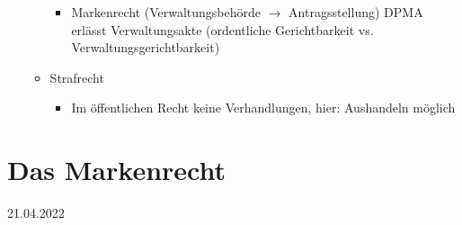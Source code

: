 \documentclass{report}
\begin{document}
\begin{itemize}
\begin{itemize}
\begin{itemize}
			\item Markenrecht (Verwaltungsbehörde $\rightarrow$ Antragsstellung)
			\newline DPMA erlässt Verwaltungsakte (ordentliche Gerichtbarkeit vs. Verwaltungsgerichtbarkeit)
		\end{itemize}
		\item Strafrecht
		\begin{itemize}
			\item Im öffentlichen Recht keine Verhandlungen, hier: Aushandeln möglich
		\end{itemize}
	\end{itemize}
\end{itemize}

\newpage
\section{Das Markenrecht}
21.04.2022
\end{document}
